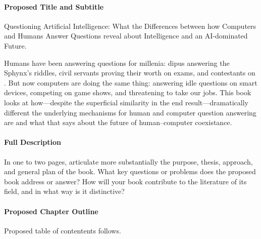 
\paragraph{Proposed Title and Subtitle}

Questioning Artificial Intelligence: What the Differences between how Computers and Humans Answer Questions reveal about Intelligence and an AI-dominated Future.


Humans have been answering questions for millenia: \Oe{}dipus answering the Sphynx's riddles, civil servants proving their worth on exams, and contestants on \jeopardy{}.
%
But now computers are doing the same thing: answering idle questions on smart devices, competing on game shows, and threatening to take our jobs.
%
This book looks at how---despite the superficial similarity in the end result---dramatically different the underlying mechanisms for human and computer question answering are and what that says about the future of human--computer coexistance.


\paragraph{Full Description}

In one to two pages, articulate more substantially the purpose, thesis, approach, and general plan of the book. What key questions or problems does the proposed book address or answer? How will your book contribute to the literature of its field, and in what way is it distinctive?


\paragraph{Proposed Chapter Outline}

Proposed table of contentents follows.



